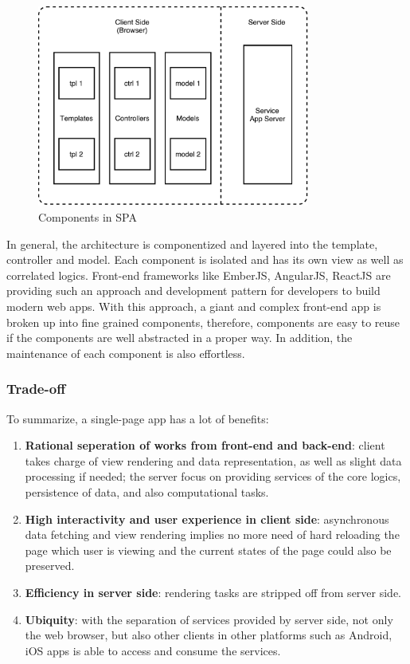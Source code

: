 \begin{figure}[!htbp]
  \centering
    \includegraphics[width=0.8\textwidth]{Figures/tech-web-arch-cmp.pdf}
  \caption{Components in SPA}
  \label{fig:3.4}
\end{figure}

In general, the architecture is componentized and layered into the template, controller and model. Each component is isolated and has its own view as well as correlated logics. Front-end frameworks like EmberJS, AngularJS, ReactJS are providing such an approach and development pattern for developers to build modern web apps. With this approach, a giant and complex front-end app is broken up into fine grained components, therefore, components are easy to reuse if the components are well abstracted in a proper way. In addition, the maintenance of each component is also effortless.


\subsubsection{Trade-off}
To summarize, a single-page app has a lot of benefits:
\begin{enumerate}
\item
\textbf{Rational seperation of works from front-end and back-end}: client takes charge of view rendering and data representation, as well as slight data processing if needed; the server focus on providing services of the core logics, persistence of data, and also computational tasks.
\item
\textbf{High interactivity and user experience in client side}: asynchronous data fetching and view rendering implies no more need of hard reloading the page which user is viewing and the current states of the page could also be preserved.
\item
\textbf{Efficiency in server side}: rendering tasks are stripped off from server side.
\item
\textbf{Ubiquity}: with the separation of services provided by server side, not only the web browser, but also other clients in other platforms such as Android, iOS apps is able to access and consume the services.
\end{enumerate}

